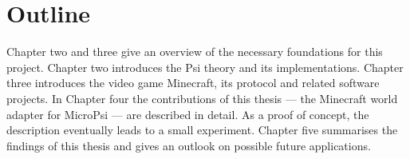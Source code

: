 \section{Outline}
Chapter two and three give an overview of the necessary foundations for this project. Chapter two introduces the Psi theory and its implementations. Chapter three introduces the video game Minecraft, its protocol and related software projects.
In Chapter four the contributions of this thesis --- the Minecraft world adapter for MicroPsi --- are described in detail. As a proof of concept, the description eventually leads to a small experiment.
Chapter five summarises the findings of this thesis and gives an outlook on possible future applications.